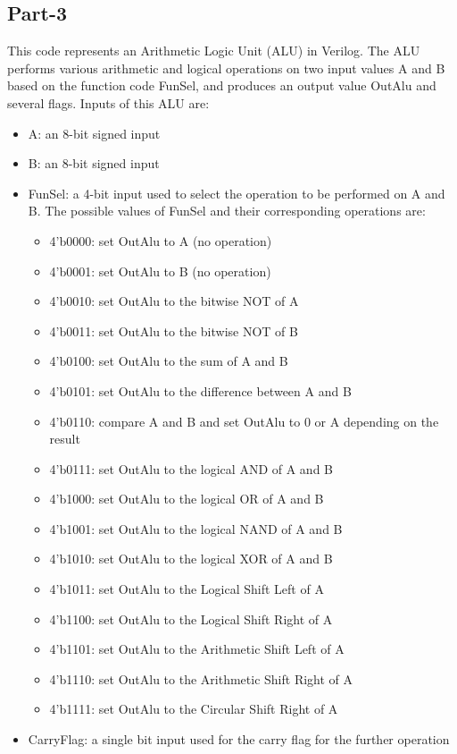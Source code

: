 \documentclass[12pt]{article}
\begin{document}
\subsection{Part-3}
This code represents an Arithmetic Logic Unit (ALU) in Verilog. The ALU performs various arithmetic and logical operations on two input values A and B based on the function code FunSel, and produces an output value OutAlu and several flags. Inputs of this ALU are:
\begin{itemize}
\item A: an 8-bit signed input
\item B: an 8-bit signed input
\item FunSel: a 4-bit input used to select the operation to be performed on A and B. The possible values of FunSel and their corresponding operations are:
   \begin{itemize}   
    \item 4'b0000: set OutAlu to A (no operation)
    \item 4'b0001: set OutAlu to B (no operation)
    \item4'b0010: set OutAlu to the bitwise NOT of A
    \item 4'b0011: set OutAlu to the bitwise NOT of B
    \item 4'b0100: set OutAlu to the sum of A and B
    \item 4'b0101: set OutAlu to the difference between A and B
    \item 4'b0110: compare A and B and set OutAlu to 0 or A depending on the result
    \item 4'b0111: set OutAlu to the logical AND of A and B
    \item 4’b1000: set OutAlu to the logical OR of A and B
    \item 4’b1001: set OutAlu to the logical NAND of A and B
    \item 4’b1010: set OutAlu to the logical XOR of A and B
    \item 4’b1011: set OutAlu to the Logical Shift Left of A
    \item 4’b1100: set OutAlu to the Logical Shift Right of A
    \item 4’b1101: set OutAlu to the Arithmetic Shift Left of A
    \item 4’b1110: set OutAlu to the Arithmetic Shift Right of A
    \item 4’b1111: set OutAlu to the Circular Shift Right of A
   \end{itemize}
\item CarryFlag: a single bit input used for the carry flag for the further operation

\end{itemize}
\end{document}
